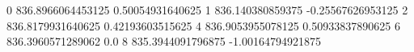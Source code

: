 0 836.8966064453125 0.50054931640625
1 836.140380859375 -0.25567626953125
2 836.8179931640625 0.42193603515625
4 836.9053955078125 0.50933837890625
6 836.3960571289062 0.0
8 835.3944091796875 -1.00164794921875
